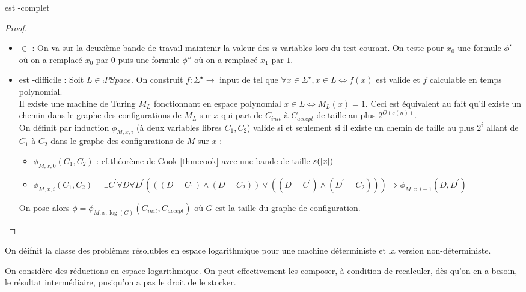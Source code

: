 \documentclass{cours}
\begin{document}
\begin{proposition}
     est -complet
\end{proposition}
\begin{proof}
    \begin{itemize}
        \item {} $\in$  : On va sur la deuxième bande de travail maintenir la valeur des $n$ variables lors du test courant. On teste pour $x_{0}$ une formule $\phi'$ où on a remplacé $x_{0}$ par $0$ puis une formule $\phi''$ où on a remplacé $x_{1}$ par $1$. 
        \item {} est -difficile : Soit $L \in \comp{PSpace}$. On construit $f : \Sigma^{\star} \rightarrow$ input de  tel que $\forall x \in \Sigma^{\star}, x \in L \Leftrightarrow f(x)$ est valide et $f$ calculable en temps polynomial. \\
        Il existe une machine de Turing $M_{L}$ fonctionnant en espace polynomial $x\in L \Leftrightarrow M_{L}(x) = 1$. Ceci est équivalent au fait qu'il existe un chemin dans le graphe des configurations de $M_{L}$ sur $x$ qui part de $C_{init}$ à $C_{accept}$ de taille au plus $2^{O(s(n))}$.\\
        On définit par induction $\phi_{M, x, i}$ (à deux variables libres $C_{1}, C_{2}$) valide si et seulement si il existe un chemin de taille au plus $2^{i}$ allant de $C_{1}$ à $C_{2}$ dans le graphe des configurations de $M$ sur $x$ : 
        \begin{itemize}
            \item $\phi_{M, x, 0}(C_{1}, C_{2})$ : cf.théorème de Cook \ref{thm:cook} avec une bande de taille $s(\left|x\right|)$
            \item $\phi_{M, x, i}(C_{1}, C_{2}) = \exists C^{'}\forall D \forall D^{'}\left(\left((D = C_{1})\land (D = C_{2})\right)\lor \left((D = C^{'}) \land (D^{'} = C_{2})\right)\right) \Rightarrow \phi_{M, x, i - 1}(D, D^{'})$
        \end{itemize}
        On pose alors $\phi = \phi_{M, x, \log(G)}(C_{init}, C_{accept})$ où $G$ est la taille du graphe de configuration. 
    \end{itemize}
\end{proof}

\begin{definition}
    On déifnit  la classe des problèmes résolubles en espace logarithmique pour une machine déterministe et  la version non-déterministe. 
\end{definition}
On considère des réductions en espace logarithmique. On peut effectivement les composer, à condition de recalculer, dès qu'on en a besoin, le résultat intermédiaire, pusiqu'on a pas le droit de le stocker. 
\end{document}
